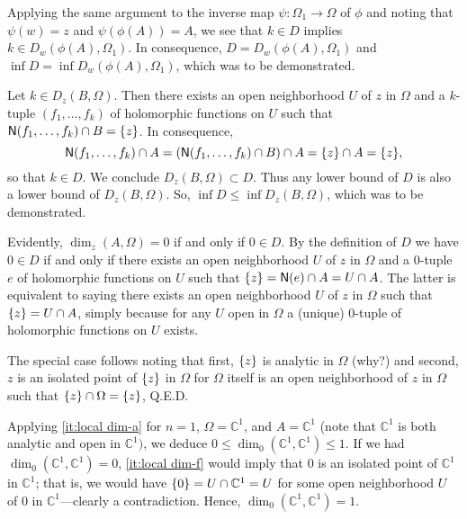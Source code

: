\documentclass[a4paper]{amsart}
\newcommand{\C}{\mathbb{C}}
\newcommand{\Zero}[1]{\mathsf{N}(#1)}
\theoremstyle{remark}
\numberwithin{equation}{question}
\DeclarePairedDelimiter\set{\{}{\}}
\begin{document}
\begin{solution}
\begin{solenum}
Applying the same argument to the inverse map $\psi \colon \Omega_1 \to \Omega$ of $\phi$ and noting that $\psi(w) = z$ and $\psi(\phi(A)) = A$, we see that $k \in D$ implies $k \in D_w(\phi(A),\Omega_1)$. In consequence, $D = D_w(\phi(A),\Omega_1)$ and $\inf D = \inf D_w(\phi(A),\Omega_1)$, which was to be demonstrated.

\item Let $k \in D_z(B,\Omega)$. Then there exists an open neighborhood $U$ of $z$ in $\Omega$ and a $k$-tuple $(f_1,\dots,f_k)$ of holomorphic functions on $U$ such that $\Zero{f_1,\dots,f_k} \cap B = \set z$. In consequence,
\[
\Zero{f_1,\dots,f_k} \cap A = (\Zero{f_1,\dots,f_k} \cap B) \cap A = \set z \cap A = \set z,
\]
so that $k \in D$. We conclude $D_z(B,\Omega) \subset D$. Thus any lower bound of $D$ is also a lower bound of $D_z(B,\Omega)$. So, $\inf D \le \inf D_z(B,\Omega)$, which was to be demonstrated.

\item Evidently, $\dim_z(A,\Omega) = 0$ if and only if $0 \in D$. By the definition of $D$ we have $0 \in D$ if and only if there exists an open neighborhood $U$ of $z$ in $\Omega$ and a $0$-tuple $e$ of holomorphic functions on $U$ such that $\set z = \Zero e \cap A = U \cap A$. The latter is equivalent to saying there exists an open neighborhood $U$ of $z$ in $\Omega$ such that $\set z = U \cap A$, simply because for any $U$ open in $\Omega$ a (unique) $0$-tuple of holomorphic functions on $U$ exists.

The special case follows noting that first, $\set z$ is analytic in $\Omega$ (why?) and second, $z$ is an isolated point of $\set z$ in $\Omega$ for $\Omega$ itself is an open neighborhood of $z$ in $\Omega$ such that $\set z \cap \Omega = \set z$, Q.E.D.

\item Applying \cref{it:local dim-a} for $n=1$, $\Omega = \C^1$, and $A = \C^1$ (note that $\C^1$ is both analytic and open in $\C^1)$, we deduce $0 \le \dim_0(\C^1,\C^1) \le 1$. If we had $\dim_0(\C^1,\C^1) = 0$, \cref{it:local dim-f} would imply that $0$ is an isolated point of $\C^1$ in $\C^1$; that is, we would have $\set0 = U \cap \C^1 = U$ for some open neighborhood $U$ of $0$ in $\C^1$---clearly a contradiction. Hence, $\dim_0(\C^1,\C^1) = 1$.


\end{solenum}
\end{solution}
\end{document}
